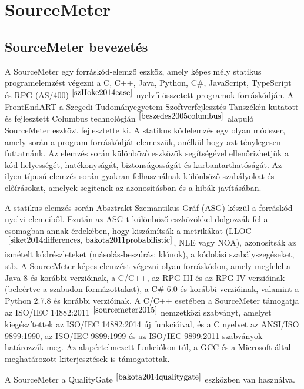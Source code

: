 \chapter{SourceMeter}\label{chap:SourceMeter}

\section{SourceMeter bevezetés}

\noindent

A SourceMeter egy forráskód-elemző eszköz, amely képes mély statikus programelemzést végezni a C, C++, Java, Python, C\#, JavaScript, TypeScript és RPG (AS/400)$^{~\cite{szHoke2014case}}$
nyelvű összetett programok forráskódján.
A FrontEndART a Szegedi Tudományegyetem Szoftverfejlesztés Tanszékén kutatott és fejlesztett Columbus technológián$^{~\cite{beszedes2005columbus}}$ alapuló SourceMeter eszközt fejlesztette ki.
A statikus kódelemzés egy olyan módszer, amely során a program forráskódját elemezzük, anélkül hogy azt ténylegesen futtatnánk.
Az elemzés során különböző eszközök segítségével ellenőrizhetjük a kód helyességét, hatékonyságát, biztonságosságát és karbantarthatóságát.
Az ilyen típusú elemzés során gyakran felhasználnak különböző szabályokat és előírásokat, amelyek segítenek az azonosításban és a hibák javításában.

\noindent

A statikus elemzés során Absztrakt Szemantikus Gráf (ASG) készül a forráskód nyelvi elemeiből.
Ezután az ASG-t különböző eszközökkel dolgozzák fel a csomagban annak érdekében, hogy kiszámítsák a metrikákat (LLOC$^{~\cite{siket2014differences, bakota2011probabilistic}}$, NLE vagy NOA),
azonosítsák az ismételt kódrészleteket (másolás-beszúrás; klónok), a kódolási szabályszegéseket, stb.
A SourceMeter képes elemzést végezni olyan forráskódon, amely megfelel a Java 8 és korábbi verzióinak, a C/C++,
az RPG III és az RPG IV verzióinak (beleértve a szabadon formázottakat), a C\# 6.0 és korábbi verzióinak, valamint a Python 2.7.8 és korábbi verzióinak.
A C/C++ esetében a SourceMeter támogatja az ISO/IEC 14882:2011$^{~\cite{sourcemeter2015}}$ nemzetközi szabványt, amelyet kiegészítettek az ISO/IEC 14882:2014 új funkcióival, és a C nyelvet az ANSI/ISO 9899:1990, az ISO/IEC 9899:1999 és az ISO/IEC 9899:2011 szabványok határozzák meg.
Az alapértelmezett funkciókon túl, a GCC és a Microsoft által meghatározott kiterjesztések is támogatottak.

\noindent

A SourceMeter a QualityGate$^{~\cite{bakota2014qualitygate}}$ eszközben van használva.


